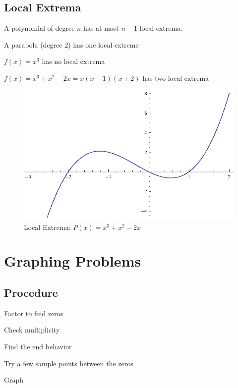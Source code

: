 \documentclass{article}
\begin{document}
\subsection{Local Extrema}
A polynomial of degree $n$ has at most $n - 1$ local extrema.  
\begin{itemize*}
  \item A parabola (degree 2) has one local extreme
  \item $f(x) = x^3$ has no local extrema
  \item $f(x) = x^3 + x^2 - 2x = x(x - 1)(x + 2)$ has two local extrema
\end{itemize*}

\begin{figure}[H]
  \centering
  \includegraphics[scale=0.9]{graph4.eps}
  \caption*{Local Extrema: $P(x) = x^3 + x^2 - 2x$}
\end{figure}

\section{Graphing Problems}
\subsection{Procedure}

\begin{itemize*}
  \item Factor to find zeros
  \item Check multiplicity
  \item Find the end behavior
  \item Try a few sample points between the zeros
  \item Graph
\end{itemize*}
\end{document}
